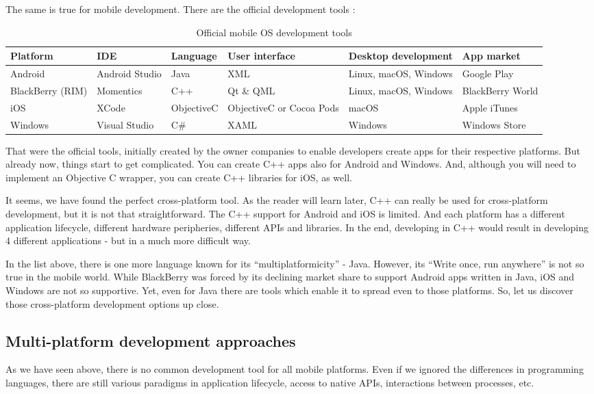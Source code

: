 \documentclass[english,master,public,dept460,male,cpdeclaration,oneside]{diploma}
\begin{document}
The same is true for mobile development. There are the official development tools \cite{taxonomyCP}:
\begin{table}[!ht]
	\centering
	\caption{Official mobile OS development tools}
	\begin{tabular}{p{2cm} p{2cm} p{2cm} p{2.5cm} p{2.5cm} p{2.5cm}}
		\toprule
		Platform & IDE & Language & User interface & Desktop development & App market\\
		\midrule
		Android & Android Studio & Java & XML & Linux, macOS, Windows & Google Play\\
		BlackBerry (RIM) & Momentics & C++ & Qt \& QML & Linux, macOS, Windows & BlackBerry World \\
		iOS & XCode & ObjectiveC & ObjectiveC or Cocoa Pods & macOS & Apple iTunes \\
		Windows & Visual Studio & C\# & XAML & Windows & Windows Store \\
		\midrule
	\end{tabular}
\end{table}

That were the official tools, initially created by the owner companies to enable developers create apps for their respective platforms. But already now, things start to get complicated. You can create C++ apps also for Android and Windows. And, although you will need to implement an Objective C wrapper, you can create C++ libraries for iOS, as well.

It seems, we have found the perfect cross-platform tool. As the reader will learn later, C++ can really be used for cross-platform development, but it is not that straightforward. The C++ support for Android and iOS is limited. And each platform has a different application lifecycle, different hardware peripheries, different APIs and libraries. In the end, developing in C++ would result in developing 4 different applications - but in a much more difficult way.

In the list above, there is one more language known for its “multiplatformicity” - Java. However, its “Write once, run anywhere” is not so true in the mobile world. While BlackBerry was forced by its declining market share to support Android apps written in Java, iOS and Windows are not so supportive. Yet, even for Java there are tools which enable it to spread even to those platforms. So, let us discover those cross-platform development options up close.

\subsection{Multi-platform development approaches}
As we have seen above, there is no common development tool for all mobile platforms. Even if we ignored the differences in programming languages, there are still various paradigms in application lifecycle, access to native APIs, interactions between processes, etc.
\end{document}
